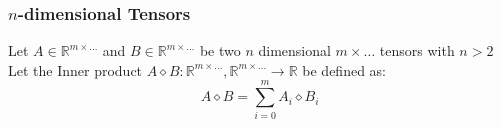 \documentclass[12pt]{article}
\newcommand{\source}[1]{\caption*{Source: {#1}} }
\begin{document}
\subsubsection{\(n\)-dimensional Tensors}
Let \(A \in \mathbb{R}^{m \times \dots}\) and \(B \in \mathbb{R}^{m \times \dots}\) be two \(n\) dimensional \(m \times \dots\) tensors with \(n > 2\)\\
Let the Inner product \(A \diamond B : \mathbb{R}^{m \times \dots}, \mathbb{R}^{m \times \dots} \to \mathbb{R}\) be defined as:
\begin{equation}\label{eq:defs:Inner_product_3d}
A \diamond B = \sum_{i=0}^{m} A_{i} \diamond B_{i}
\end{equation}
%
%    
%
\end{document}
